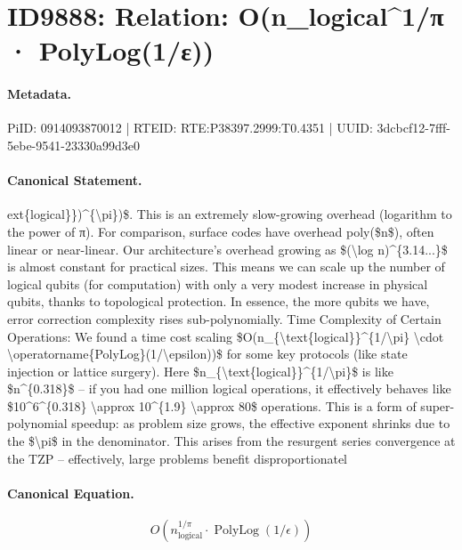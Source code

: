 \section*{ID9888: Relation: O(n\_logical\textasciicircum{}1/π · PolyLog(1/ε))}
\paragraph{Metadata.}
PiID: 0914093870012 | RTEID: RTE:P38397.2999:T0.4351 | UUID: 3dcbcf12-7fff-5ebe-9541-23330a99d3e0

\paragraph{Canonical Statement.}
ext\{logical\}\})\textasciicircum{}\{\textbackslash{}pi\})\$. This is an extremely slow-growing overhead (logarithm to the power of π). For comparison, surface codes have overhead poly(\$n\$), often linear or near-linear. Our architecture’s overhead growing as \$(\textbackslash{}log n)\textasciicircum{}\{3.14...\}\$ is almost constant for practical sizes. This means we can scale up the number of logical qubits (for computation) with only a very modest increase in physical qubits, thanks to topological protection. In essence, the more qubits we have, error correction complexity rises sub-polynomially. Time Complexity of Certain Operations: We found a time cost scaling \$O(n\_\{\textbackslash{}text\{logical\}\}\textasciicircum{}\{1/\textbackslash{}pi\} \textbackslash{}cdot \textbackslash{}operatorname\{PolyLog\}(1/\textbackslash{}epsilon))\$ for some key protocols (like state injection or lattice surgery). Here \$n\_\{\textbackslash{}text\{logical\}\}\textasciicircum{}\{1/\textbackslash{}pi\}\$ is like \$n\textasciicircum{}\{0.318\}\$ – if you had one million logical operations, it effectively behaves like \$10\textasciicircum{}6\textasciicircum{}\{0.318\} \textbackslash{}approx 10\textasciicircum{}\{1.9\} \textbackslash{}approx 80\$ operations. This is a form of super-polynomial speedup: as problem size grows, the effective exponent shrinks due to the \$\textbackslash{}pi\$ in the denominator. This arises from the resurgent series convergence at the TZP – effectively, large problems benefit disproportionatel

\paragraph{Canonical Equation.}
\[
O(n_{\text{logical}}^{1/\pi} \cdot \operatorname{PolyLog}(1/\epsilon))
\]

